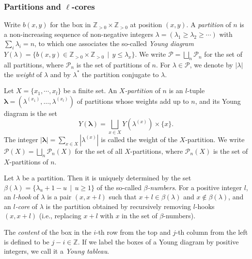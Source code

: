 \documentclass[12pt]{amsart}
\numberwithin{itemcounter}{subsection}
\theoremstyle{plain}
\theoremstyle{definition}
\theoremstyle{remark}
\numberwithin{equation}{section}
\def\bbZ{\mathbb{Z}}
\def\scrP{\mathscr{P}}
\def\Z{\operatorname{Z}\nolimits}
\def\Z{{\mathbb Z}}
\newcommand*{\tuple}[1]
{\boldsymbol{#1}}
\begin{document}
							\subsubsection{Partitions and $\ell$-cores}
                            Write $b(x,y)$ for the box in $\Z_{>0}\times \Z_{>0}$ at position $(x,y)$. A \emph{partition} of $n$ is a non-increasing sequence of non-negative integers
							$\lambda = (\lambda_1 \geqslant \lambda_2 \geqslant \cdots)$ with $\sum_i \lambda_i=n$,
							to which one
							associates the so-called \emph{Young diagram}
							$Y(\lambda)=\{b(x,y)\in\bbZ_{>0}\times\bbZ_{>0}\,\mid\,y\leqslant \lambda_x\}.$
							We write $\scrP=\bigsqcup_n\scrP_n$ for the set
							of all partitions, where $\scrP_n$ is the set of partitions of $n$.
							For $\lambda\in \scrP$, we denote by $|\lambda|$ the \emph{weight}
							of $\lambda$ and by $\lambda^*$ the partition  conjugate to $\lambda$.

							\smallskip

							Let $X=\{x_1,\cdots, x_l\}$ be a finite set. An \emph{$X$-partition} of $n$ is an $l$-tuple $\tuple\lambda=(\lambda^{(x_1)},\ldots,\lambda^{(x_l)})$ of partitions whose weights add up to $n$,
							and its Young diagram is the set $$Y(\tuple\lambda)=\bigsqcup_{x\in X}Y(\lambda^{(x)})\times\{x\}.$$
							The integer $|\tuple\lambda|=\sum\limits_{x\in X}|\lambda^{(x)}|$ is called the weight of the $X$-partition.
							We write $\scrP(X)=\bigsqcup_n\scrP_n(X)$ for the set of all $X$-partitions, where
							$\scrP_n(X)$ is the set of $X$-partitions of $n$.

							\smallskip

							Let  $\lambda$ be a partition.
							Then it is uniquely determined by
							the set $\beta(\lambda)=\{\lambda_u+1-u\,\mid
							\,u\geqslant 1\}$ of the  so-called \emph{$\beta$-numbers}.
							For a positive integer $l$,  an \emph{$l$-hook} of $\lambda$ is a pair $(x,x+l)$ such
							that $x+l\in \beta(\lambda)$ and $x\not\in \beta(\lambda)$, and
							an \emph{$l$-core} of $\lambda$
							is the partition obtained by recursively removing $l$-hooks
							$(x,x+l)$
							(i.e., replacing $x+l$ with $x$ in the set of $\beta$-numbers).

							\smallskip
							The \emph{content} of the box in the $i$-th row from the top and $j$-th column from the left is defined to be $j-i \in \mathbb{Z}$. If we label the boxes of a Young diagram  by positive integers, we call it a \emph{Young tableau}.
\end{document}
